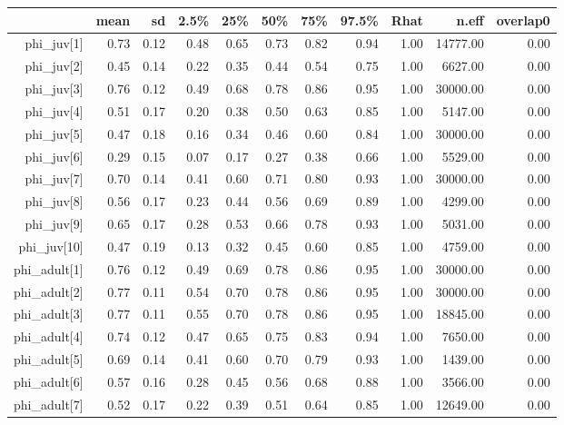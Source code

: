\begin{table}[ht]
\centering
\begin{tabular}{rrrrrrrrrrr}
  \hline
 & mean & sd & 2.5\% & 25\% & 50\% & 75\% & 97.5\% & Rhat & n.eff & overlap0 \\ 
  \hline
phi\_juv[1] & 0.73 & 0.12 & 0.48 & 0.65 & 0.73 & 0.82 & 0.94 & 1.00 & 14777.00 & 0.00 \\ 
  phi\_juv[2] & 0.45 & 0.14 & 0.22 & 0.35 & 0.44 & 0.54 & 0.75 & 1.00 & 6627.00 & 0.00 \\ 
  phi\_juv[3] & 0.76 & 0.12 & 0.49 & 0.68 & 0.78 & 0.86 & 0.95 & 1.00 & 30000.00 & 0.00 \\ 
  phi\_juv[4] & 0.51 & 0.17 & 0.20 & 0.38 & 0.50 & 0.63 & 0.85 & 1.00 & 5147.00 & 0.00 \\ 
  phi\_juv[5] & 0.47 & 0.18 & 0.16 & 0.34 & 0.46 & 0.60 & 0.84 & 1.00 & 30000.00 & 0.00 \\ 
  phi\_juv[6] & 0.29 & 0.15 & 0.07 & 0.17 & 0.27 & 0.38 & 0.66 & 1.00 & 5529.00 & 0.00 \\ 
  phi\_juv[7] & 0.70 & 0.14 & 0.41 & 0.60 & 0.71 & 0.80 & 0.93 & 1.00 & 30000.00 & 0.00 \\ 
  phi\_juv[8] & 0.56 & 0.17 & 0.23 & 0.44 & 0.56 & 0.69 & 0.89 & 1.00 & 4299.00 & 0.00 \\ 
  phi\_juv[9] & 0.65 & 0.17 & 0.28 & 0.53 & 0.66 & 0.78 & 0.93 & 1.00 & 5031.00 & 0.00 \\ 
  phi\_juv[10] & 0.47 & 0.19 & 0.13 & 0.32 & 0.45 & 0.60 & 0.85 & 1.00 & 4759.00 & 0.00 \\ 
  phi\_adult[1] & 0.76 & 0.12 & 0.49 & 0.69 & 0.78 & 0.86 & 0.95 & 1.00 & 30000.00 & 0.00 \\ 
  phi\_adult[2] & 0.77 & 0.11 & 0.54 & 0.70 & 0.78 & 0.86 & 0.95 & 1.00 & 30000.00 & 0.00 \\ 
  phi\_adult[3] & 0.77 & 0.11 & 0.55 & 0.70 & 0.78 & 0.86 & 0.95 & 1.00 & 18845.00 & 0.00 \\ 
  phi\_adult[4] & 0.74 & 0.12 & 0.47 & 0.65 & 0.75 & 0.83 & 0.94 & 1.00 & 7650.00 & 0.00 \\ 
  phi\_adult[5] & 0.69 & 0.14 & 0.41 & 0.60 & 0.70 & 0.79 & 0.93 & 1.00 & 1439.00 & 0.00 \\ 
  phi\_adult[6] & 0.57 & 0.16 & 0.28 & 0.45 & 0.56 & 0.68 & 0.88 & 1.00 & 3566.00 & 0.00 \\ 
  phi\_adult[7] & 0.52 & 0.17 & 0.22 & 0.39 & 0.51 & 0.64 & 0.85 & 1.00 & 12649.00 & 0.00 \\ 

\end{tabular}
\end{table}

